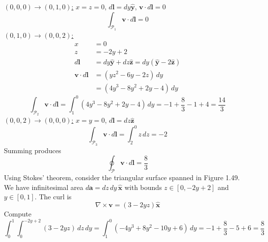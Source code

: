 \documentclass[a4paper]{article}
\begin{document}

\underline{\( \!\left( 0,0,0 \right) \rightarrow \!\left( 0,1,0 \right) \):} \( x = z = 0 \), \( d \pmb{l} = dy \pmb{\hat{y}} \), \( \pmb{v} \cdot d \pmb{l} = 0 \)
\[
	\int_{\mathcal{P}_{1}} \pmb{v} \cdot d \pmb{l} = 0 
\]
\underline{\( \!\left( 0,1,0 \right) \rightarrow \!\left( 0,0,2 \right) \):} 
\begin{align*}
	x & = 0 \\
	z & = -2y + 2 \\ 
	d \pmb{l} & = dy \pmb{\hat{y}} + dz \pmb{\hat{z}} = dy \!\left( \pmb{\hat{y}} - 2 \pmb{\hat{z}} \right) \\
	\pmb{v} \cdot d \pmb{l} & = \!\left( yz^{2} - 6y - 2z \right) \, dy \\
				& = \!\left( 4y^{3} - 8y^{2} + 2y - 4 \right) \, dy
\end{align*}
\[
	\int_{\mathcal{P}_{2}} \pmb{v} \cdot d \pmb{l} = \int^{0}_{1} \!\left( 4y^{3} - 8y^{2} + 2y - 4 \right) \, dy = - 1 + \frac{8}{3} - 1 + 4 = \frac{14}{3}  
\]
\underline{\( \!\left( 0,0,2 \right) \rightarrow \!\left( 0,0,0 \right) \):} \( x = y = 0 \), \( d \pmb{l} = dz \pmb{\hat{z}} \)
\[
	\int_{\mathcal{P}_{3}} \pmb{v} \cdot d \pmb{l} = \int^{0}_{2} z \, dz = -2 
\]
Summing produces
\[
	\oint_{\mathcal{P}} \pmb{v} \cdot d \pmb{l} = \frac{8}{3}
\]
Using Stokes' theorem, consider the triangular surface spanned in Figure 1.49. We have infinitesimal area \( d \pmb{a} = dz \, dy \, \pmb{\hat{x}} \) with bounds \( z \in \!\left[ 0, -2y + 2 \right] \) and \( y \in \!\left[ 0,1 \right] \). The curl is
\[
	\nabla \times \pmb{v} = \!\left( 3 - 2yz \right)\pmb{\hat{x}}
\]
Compute
\[
	\int^{1}_{0} \int^{-2y + 2}_{0} \!\left( 3 - 2yz \right) \, dz \, dy = \int^{0}_{1} \!\left( -4y^{3} + 8y^{2} - 10y + 6 \right) \, dy = -1 + \frac{8}{3} - 5 + 6 = \frac{8}{3}
\]

\end{document}
